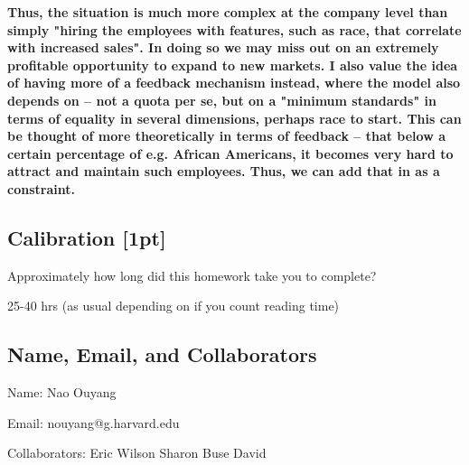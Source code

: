 \documentclass[submit]{harvardml}
\newenvironment{answer}{%
    \color{answergreen}\bf}
  {%
  }
\begin{document}
\begin{answer}
Thus, the situation is much more complex at the company level than simply "hiring the employees with
features, such as race, that correlate with increased sales". In doing so we may miss out on an
extremely profitable opportunity to expand to new markets. I also value the idea of having
more of a feedback mechanism instead, where the model also depends on -- not a quota per se, but on
a "minimum standards" in terms of equality in several dimensions, perhaps race to start. This can be
thought of more theoretically in terms of feedback -- that below a certain percentage of e.g.
African Americans, it becomes very hard to attract and maintain such employees. Thus, we
can add that in as a constraint.

    \end{answer}
\newpage


\subsection*{Calibration [1pt]}
Approximately how long did this homework take you to complete?

25-40 hrs (as usual depending on if you count reading time)

\subsection*{Name, Email, and Collaborators}

Name: Nao Ouyang

Email: nouyang@g.harvard.edu    

Collaborators:
Eric
Wilson
Sharon
Buse
David
\end{document}
